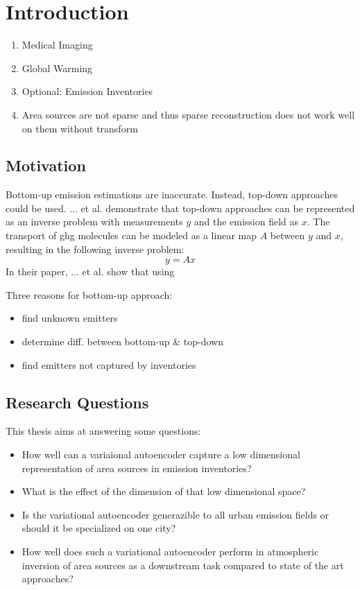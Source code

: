 
\chapter{Introduction}\label{chapter:introduction}

\begin{enumerate}
	\item Medical Imaging
	\item Global Warming
	\item Optional: Emission Inventories
	\item Area sources are not sparse and thus sparse reconstruction does not work well on them without transform
\end{enumerate}

\section{Motivation}
Bottom-up emission estimations are inaccurate.
Instead, top-down approaches could be used.
... et al. demonstrate that top-down approaches can be represented as an inverse problem with measurements $y$ and the emission field as $x$.
The transport of ghg molecules can be modeled as a linear map $A$ between $y$ and $x$, resulting in the following inverse problem:
\begin{equation}
	y = Ax
\end{equation}
In their paper, ... et al. show that using

Three reasons for bottom-up approach:
\begin{itemize}
	\item find unknown emitters
	\item determine diff. between bottom-up \& top-down
	\item find emitters not captured by inventories
\end{itemize}

\section{Research Questions}
This thesis aims at answering some questions:

\begin{itemize}
	\item How well can a variaional autoencoder capture a low dimensional representation of area sources in emission inventories?
	\item What is the effect of the dimension of that low dimensional space?
	\item Is the variational autoencoder generazible to all urban emission fields or should it be specialized on one city?
	\item How well does such a variational autoencoder perform in atmospheric inversion of area sources as a downstream task compared to state of the art approaches?
\end{itemize}
